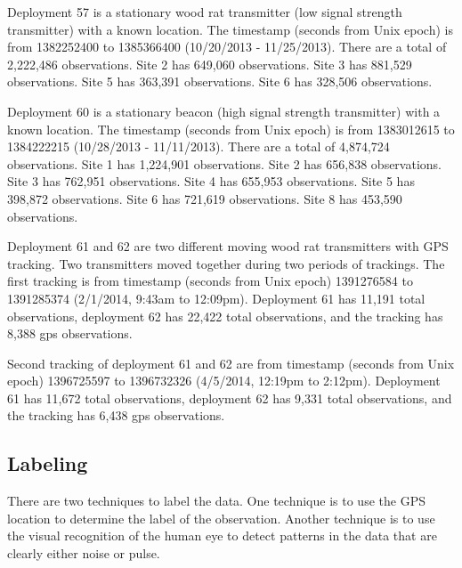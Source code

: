 \documentclass[twoside]{article}
\begin{document}
\begin{compactitem}
\item Deployment 57 is a stationary wood rat transmitter (low signal strength transmitter) with a known location. The timestamp (seconds from Unix epoch) is from 1382252400 to 1385366400 (10/20/2013 - 11/25/2013). There are a total of 2,222,486 observations. Site 2 has 649,060 observations. Site 3 has 881,529 observations. Site 5 has 363,391 observations. Site 6 has 328,506 observations.
\item Deployment 60 is a stationary beacon (high signal strength transmitter) with a known location. The timestamp  (seconds from Unix epoch) is from 1383012615 to 1384222215 (10/28/2013 - 11/11/2013). There are a total of 4,874,724 observations. Site 1 has 1,224,901 observations. Site 2 has 656,838 observations. Site 3 has 762,951 observations. Site 4 has 655,953 observations. Site 5 has 398,872 observations. Site 6 has 721,619 observations. Site 8 has 453,590 observations.
\item Deployment 61 and 62 are two different moving wood rat transmitters with GPS tracking. Two transmitters moved together during two periods of trackings. The first tracking is from timestamp  (seconds from Unix epoch) 1391276584 to 1391285374 (2/1/2014, 9:43am to 12:09pm). Deployment 61 has 11,191 total observations, deployment 62 has 22,422 total observations, and the tracking has 8,388 gps observations. 
\item Second tracking of deployment 61 and 62 are from timestamp  (seconds from Unix epoch) 1396725597 to 1396732326 (4/5/2014, 12:19pm to 2:12pm). Deployment 61 has 11,672 total observations, deployment 62 has 9,331 total observations, and the tracking has 6,438 gps observations.

\end{compactitem}

\subsection{Labeling}
There are two techniques to label the data. One technique is to use the GPS location to determine the label of the observation. Another technique is to use the visual recognition of the human eye to detect patterns in the data that are clearly either noise or pulse.
\end{document}
